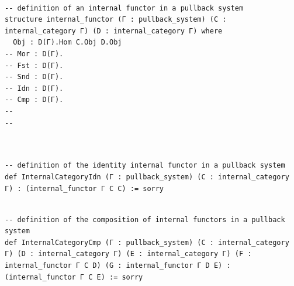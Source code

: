 \documentclass{book}
\theoremstyle{definition}
\newcounter{lcounter}
\begin{document}
\begin{center}
\begin{tcolorbox}[width=5in,colback={white},title={\begin{center}\texttt{Lean \thelcounter} \addtocounter{lcounter}{1}  \end{center}},colbacktitle=Blue,coltitle=black]
\begin{verbatim}

-- definition of an internal functor in a pullback system
structure internal_functor (Γ : pullback_system) (C : internal_category Γ) (D : internal_category Γ) where
  Obj : D(Γ).Hom C.Obj D.Obj
-- Mor : D(Γ).
-- Fst : D(Γ).
-- Snd : D(Γ).
-- Idn : D(Γ).
-- Cmp : D(Γ).
--
--


\end{verbatim}
\end{tcolorbox}
\end{center}


\begin{center}
\begin{tcolorbox}[width=5in,colback={white},title={\begin{center}\texttt{Lean \thelcounter} \addtocounter{lcounter}{1}  \end{center}},colbacktitle=Blue,coltitle=black]
\begin{verbatim}

-- definition of the identity internal functor in a pullback system
def InternalCategoryIdn (Γ : pullback_system) (C : internal_category Γ) : (internal_functor Γ C C) := sorry

\end{verbatim}
\end{tcolorbox}
\end{center}

\begin{center}
\begin{tcolorbox}[width=5in,colback={white},title={\begin{center}\texttt{Lean \thelcounter} \addtocounter{lcounter}{1}  \end{center}},colbacktitle=Blue,coltitle=black]
\begin{verbatim}

-- definition of the composition of internal functors in a pullback system
def InternalCategoryCmp (Γ : pullback_system) (C : internal_category Γ) (D : internal_category Γ) (E : internal_category Γ) (F : internal_functor Γ C D) (G : internal_functor Γ D E) : (internal_functor Γ C E) := sorry

\end{verbatim}
\end{tcolorbox}
\end{center}
\end{document}
